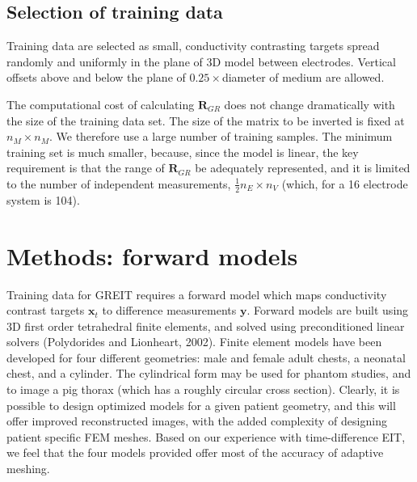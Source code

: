 \documentclass[12pt]{iopart}
\newcommand{\xB}{\mbox{$\mathbf{x}$}}
\newcommand{\yB}{\mbox{$\mathbf{y}$}}
\newcommand{\RB}{\mbox{$\mathbf{R}$}}
\begin{document}
\subsection{Selection of training data}
\label{subsec:training_data}

Training data are selected as small, conductivity contrasting
targets spread randomly and uniformly in the plane of 3D model
between electrodes. Vertical offsets above and below the
plane of $0.25\times$diameter of medium are allowed.

The computational cost of calculating $\RB_{GR}$ does
not change dramatically with the size of the training data
set. The size of the matrix to be inverted is fixed at
$n_M \times n_M$. We therefore use a large number of
training samples. The minimum training set 
is much smaller, because, since the model is
linear, the key requirement is that the range of 
$\RB_{GR}$ be adequately represented, and it is limited
to the number of independent measurements,
$\frac{1}{2} n_E \times n_V$ (which, for a 16 electrode
system is 104).

\section{Methods: forward models}

Training data for GREIT requires a forward model which
maps conductivity contrast targets $\xB_t$ to difference
measurements $\yB$. Forward models are built using
3D first order tetrahedral finite elements, and
solved using preconditioned linear solvers
(Polydorides and Lionheart, 2002).
Finite element models have been developed for four
different geometries: 
male and female adult chests,
a neonatal chest, and
a cylinder. The cylindrical form may be used
for phantom studies, and to image a pig thorax
(which has a roughly circular cross section).
Clearly, it is possible to design optimized
models for a given patient geometry, and this
will offer improved reconstructed images,
with the added complexity of designing
patient specific FEM meshes.
Based on our experience with time-difference
EIT, we feel that the four models provided offer
most of the accuracy of adaptive meshing.
\end{document}
